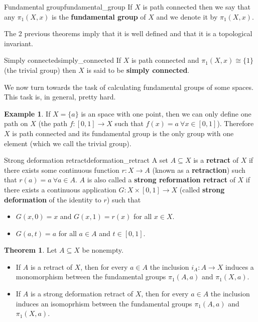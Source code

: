 \documentclass[a4paper]{book}
\theoremstyle{definition}
\newtheorem{theorem}{Theorem}[section]
\theoremstyle{ejemplo}
\newtheorem{example}{Example}[section]
\theoremstyle{demostracion}
\begin{document}
\begin{define}{Fundamental group}{fundamental_group}
	If $X$ is path connected then we say that any $\pi_1(X, x)$ is the \textbf{fundamental group} of $X$ and we denote it by $\pi_1(X, x)$. 
\end{define}
The 2 previous theorems imply that it is well defined and that it is a topological invariant.
\begin{define}{Simply connected}{simply_connected}
	If $X$ is path connected and $\pi_1(X, x) \cong \{1\}$ (the trivial group) then $X$ is said to be \textbf{simply connected}.
\end{define}

We now turn towards the task of calculating fundamental groups of some spaces. This task is, in general, pretty hard.

\begin{example}
	If $X = \{ a\}$ is an space with one point, then we can only define one path on $X$ (the path $f: [0, 1] \rightarrow X$ such that $f(x) = a\ \forall x \in [0, 1]$). Therefore $X$ is path connected and its fundamental group is the only group with one element (which we call the trivial group).
\end{example}

\begin{define}{Strong deformation retract}{deformation_retract}
	A set $A \subseteq X$ is a \textbf{retract} of $X$ if there exists some continuous function $r: X \rightarrow A$ (known as a \textbf{retraction}) such that $r(a) = a\ \forall a \in A$. $A$ is also called a \textbf{strong reformation retract} of $X$ if there exists a continuous application $G: X \times [0, 1] \rightarrow X$ (called \textbf{strong deformation} of the identity to $r$) such that
	\begin{itemize}
		\item
		$G(x, 0) = x$ and $G(x, 1) = r(x)$ for all $x \in X$.
		
		\item
		$G(a, t) = a$ for all $a \in A$ and $t \in [0, 1]$.
	\end{itemize}
\end{define}

\begin{theorem}
	Let $A \subseteq X$ be nonempty.
	\begin{itemize}
		\item
		If $A$ is a retract of $X$, then for every $a \in A$ the inclusion $i_A: A \rightarrow X$ induces a monomorphism between the fundamental groups $\pi_1(A, a)$ and $\pi_1(X, a)$.
		\item
		If $A$ is a strong deformation retract of $X$, then for every $a \in A$ the inclusion induces an isomoprhism between the fundamental groups $\pi_1(A, a)$ and $\pi_1(X, a)$.
	\end{itemize}
\end{theorem}
\end{document}
